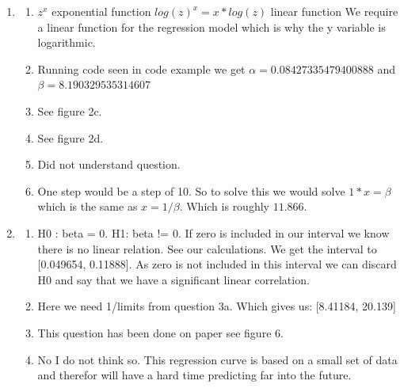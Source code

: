 \documentclass[a4paper]{article}
\begin{document}
\begin{enumerate}
\begin{enumerate}
    \end{enumerate}
    \item \begin{enumerate}
        \item  $z^x$ exponential function
        $log(z)^x = x * log(z)$ linear function
        We require a linear function for the regression model which is why the y variable is logarithmic.
        \item Running code seen in code example we get $\alpha =0.08427335479400888$ and $\beta = 8.190329535314607$
        \item See figure 2c.
        \item See figure 2d. 
        \item Did not understand question. 
        \item One step would be a step of 10. So to solve this we would solve $1*x = \beta$ which is the same as $x = 1/\beta$. Which is roughly $11.866$. 
    \end{enumerate}
    \item \begin{enumerate}
        \item H0 : beta = 0.
        H1: beta != 0. 
        If zero is included in our interval we know there is no linear relation. See our calculations. We get the interval to [0.049654, 0.11888]. As zero is not included in this interval we can discard H0 and say that we have a significant linear correlation.
         
        \item Here we need 1/limits from question 3a. Which gives us: [8.41184, 20.139] 
        \item This question has been done on paper see figure 6. 
        \item  No I do not think so. This regression curve is based on a small set of data and therefor will have a hard time predicting far into the future. 
    \end{enumerate}
\end{enumerate}
\end{document}
